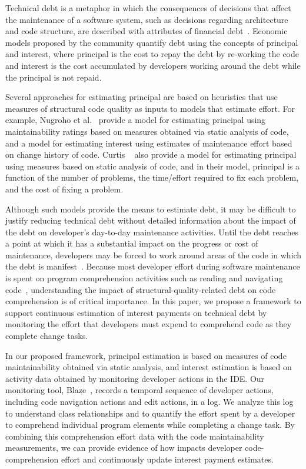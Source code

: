 Technical debt is a metaphor in which the consequences of decisions that affect the maintenance of a software system, such as decisions regarding architecture and code structure, are described with attributes of financial debt~\cite{Cunningham:1992}. Economic models proposed by the \TD community quantify debt using the concepts of principal and interest, where principal is the cost to repay the debt by re-working the code and interest is the cost accumulated by developers working around the debt while the principal is not repaid.

Several approaches for estimating principal are based on heuristics that use measures of structural code quality as inputs to models that estimate effort. For example, Nugroho et al.~\cite{Nugroho_etal:2011} provide a model for estimating principal using maintainability ratings based on measures obtained via static analysis of code, and a model for estimating interest using estimates of maintenance effort based on change history of code. Curtis \etal~\cite{Curtis_etal:2012} also provide a model for estimating principal using measures based on static analysis of code, and in their model, principal is a function of the number of problems, the time/effort required to fix each problem, and the cost of fixing a problem.  

Although such models provide the means to estimate debt, it may be difficult to justify reducing technical debt without detailed information about the impact of the debt on developer's day-to-day maintenance activities. Until the debt reaches 
a point at which it has a substantial impact on the progress or cost of maintenance, developers may be forced to work around areas of the code in which the debt is manifest~\cite{Ozkaya_etal:2011}. 
Because most developer effort during software maintenance is spent on program comprehension activities such as reading and navigating code~\cite{Fjeldstad_Hamlen:1982,Standish:1984,vonMayrhauser_etal:1997,Ko_etal:2006,LaToza_etal:2006,Tiarks:2011}, understanding the impact of structural-quality-related debt on code comprehension is of critical importance. In this paper, we propose a framework to support continuous estimation of interest payments on technical debt by monitoring the effort that developers must expend to comprehend code as they complete change tasks. 

In our proposed framework, principal estimation is based on measures of code maintainability obtained via static analysis, and interest estimation is based on activity data obtained by monitoring developer actions in the IDE. Our monitoring tool, Blaze~\cite{Snipes_etal:2014}, records a temporal sequence of developer actions, including code navigation actions and edit actions, in a log. We analyze this log to understand class relationships and to quantify the effort spent by a developer to comprehend individual program elements while completing a change task. By combining this comprehension effort data with the code maintainability measurements, we can provide evidence of how \TD impacts developer code-comprehension effort and continuously update interest payment estimates.

